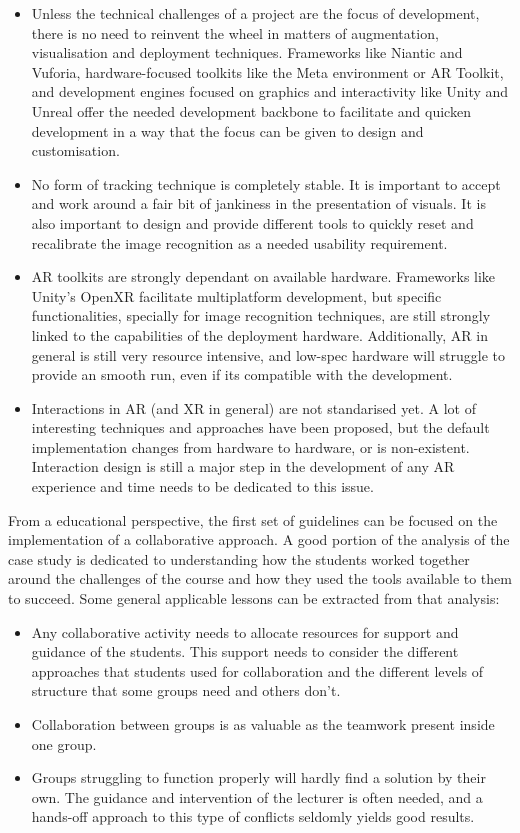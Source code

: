 \begin{itemize}
    \item Unless the technical challenges of a project are the focus of development, there is no need to reinvent the wheel in matters of augmentation, visualisation and deployment techniques.
    Frameworks like Niantic and Vuforia, hardware-focused toolkits like the Meta environment or AR Toolkit, and development engines focused on graphics and interactivity like Unity and Unreal
    offer the needed development backbone to facilitate and quicken development in a way that the focus can be given to design and customisation.
    \item No form of tracking technique is completely stable. It is important to accept and work around a fair bit of jankiness in the presentation of visuals. It is also important to design and
    provide different tools to quickly reset and recalibrate the image recognition as a needed usability requirement.
    \item \ac{AR} toolkits are strongly dependant on available hardware. Frameworks like Unity's OpenXR facilitate multiplatform development, but specific functionalities, specially for image
    recognition techniques, are still strongly linked to the capabilities of the deployment hardware. Additionally, \ac{AR} in general is still very resource intensive, and low-spec hardware will
    struggle to provide an smooth run, even if its compatible with the development.
    \item Interactions in \ac{AR} (and XR in general) are not standarised yet. A lot of interesting techniques and approaches have been proposed, but the default implementation changes from hardware to
    hardware, or is non-existent. Interaction design is still a major step in the development of any \ac{AR} experience and time needs to be dedicated to this issue.
\end{itemize}

From a educational perspective, the first set of guidelines can be focused on the implementation of a collaborative approach. A good portion of the analysis of the case study is dedicated to understanding
how the students worked together around the challenges of the course and how they used the tools available to them to succeed. Some general applicable lessons can be extracted from that analysis:

\begin{itemize}
    \item Any collaborative activity needs to allocate resources for support and guidance of the students. This support needs to consider the different approaches that students used for collaboration
    and the different levels of structure that some groups need and others don't.
    \item Collaboration between groups is as valuable as the teamwork present inside one group.
    \item Groups struggling to function properly will hardly find a solution by their own. The guidance and intervention of the lecturer is often needed, and a hands-off approach to this type of conflicts
    seldomly yields good results.
\end{itemize}

